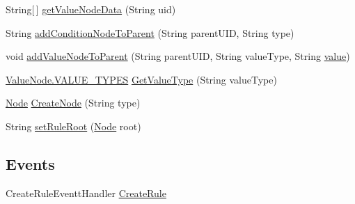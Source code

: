 \begin{DoxyCompactItemize}
\item 
String\mbox{[}$\,$\mbox{]} \hyperlink{class_web_analyzer_1_1_u_i_1_1_interaction_objects_1_1_rule_control_ae9ceeb3481aba63c3157304bf2f0965e}{get\+Value\+Node\+Data} (String uid)
\item 
String \hyperlink{class_web_analyzer_1_1_u_i_1_1_interaction_objects_1_1_rule_control_a1493baf16bd16f82f894a41532871a6b}{add\+Condition\+Node\+To\+Parent} (String parent\+U\+I\+D, String type)
\item 
void \hyperlink{class_web_analyzer_1_1_u_i_1_1_interaction_objects_1_1_rule_control_af73da3f329b8bee6d51820775c7cd123}{add\+Value\+Node\+To\+Parent} (String parent\+U\+I\+D, String value\+Type, String \hyperlink{_u_i_2_h_t_m_l_resources_2js_2lib_2underscore_8min_8js_af7e1471ab89699458c4df8bb657298f6}{value})
\item 
\hyperlink{class_web_analyzer_1_1_models_1_1_settings_model_1_1_expression_tree_1_1_value_node_ac18254d82bd6e0d754ed1a2484882d11}{Value\+Node.\+V\+A\+L\+U\+E\+\_\+\+T\+Y\+P\+E\+S} \hyperlink{class_web_analyzer_1_1_u_i_1_1_interaction_objects_1_1_rule_control_a32364cefe278f4e48c1b6ecf1f33d0f6}{Get\+Value\+Type} (String value\+Type)
\item 
\hyperlink{class_web_analyzer_1_1_models_1_1_settings_model_1_1_expression_tree_1_1_node}{Node} \hyperlink{class_web_analyzer_1_1_u_i_1_1_interaction_objects_1_1_rule_control_a145ac475b9d6d3024b351e30bc6b2bdc}{Create\+Node} (String type)
\item 
String \hyperlink{class_web_analyzer_1_1_u_i_1_1_interaction_objects_1_1_rule_control_aa85c27cdc071305cd73a0d336c4f95a5}{set\+Rule\+Root} (\hyperlink{class_web_analyzer_1_1_models_1_1_settings_model_1_1_expression_tree_1_1_node}{Node} root)
\end{DoxyCompactItemize}
\subsection*{Events}
\begin{DoxyCompactItemize}
\item 
Create\+Rule\+Eventt\+Handler \hyperlink{class_web_analyzer_1_1_u_i_1_1_interaction_objects_1_1_rule_control_a7bf67a13195858fc69b81997bb629ec5}{Create\+Rule}
\end{DoxyCompactItemize}
